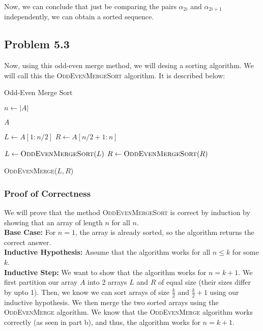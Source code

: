 \documentclass[a4paper]{article}
\begin{document}
\noindent Now, we can conclude that just be comparing the pairs $\alpha_{2i}$ and $\alpha_{2i + 1}$ independently, we can obtain a sorted sequence.\\

\subsection*{Problem 5.3}
Now, using this odd-even merge method, we will desing a sorting algorithm. We will call this the \textsc{OddEvenMergeSort} algorithm. It is described below:

\begin{algorithm}
\caption{Odd-Even Merge Sort}
\begin{algorithmic}[1]
    \State $n \gets |A|$
    
    \vspace{2mm}
        \State \Return $A$
    \EndIf

    \vspace{2mm}
    \State $L \gets A[1:n/2]$
    \State $R \gets A[n/2 + 1:n]$
    \vspace{2mm}

    \State $L \gets \textsc{OddEvenMergeSort}(L)$
    \State $R \gets \textsc{OddEvenMergeSort}(R)$

    \vspace{2mm}
    \State \Return \textsc{OddEvenMerge}($L, R$)
\EndFunction
\end{algorithmic}
\end{algorithm}


\subsubsection*{Proof of Correctness}
We will prove that the method \textsc{OddEvenMergeSort} is correct by induction by showing that an array of length $n$ for all $n$.\\

\noindent \textbf{Base Case:} For $n = 1$, the array is already sorted, so the algorithm returns the correct answer.\\

\noindent \textbf{Inductive Hypothesis:} Assume that the algorithm works for all $n \le
k$ for some $k$.\\

\noindent \textbf{Inductive Step:} We want to show that the algorithm works for $n = k + 1$. We first partition our array $A$ into 2 arrays $L$ and $R$ of equal size (their sizes differ by upto 1). Then, we know we can sort arrays of size $\frac{k}{2}$ and $\frac{k}{2} + 1$ using our inductive hypothesis. We then merge the two sorted arrays using the \textsc{OddEvenMerge} algorithm. We know that the \textsc{OddEvenMerge} algorithm works correctly (as seen in part b), and thus, the algorithm works for $n = k + 1$.\\
\end{document}
